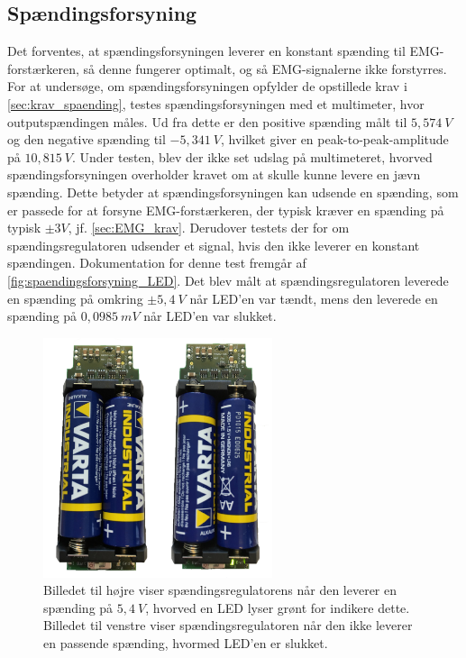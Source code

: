 \subsection{Spændingsforsyning} \label{test_spaendingsforsyning}
Det forventes, at spændingsforsyningen leverer en konstant spænding til EMG-forstærkeren, så denne fungerer optimalt, og så EMG-signalerne ikke forstyrres. For at undersøge, om spændingsforsyningen opfylder de opstillede krav i \ref{sec:krav_spaending}, testes spændingsforsyningen med et multimeter, hvor outputspændingen måles. %
Ud fra dette er den positive spænding målt til $5,574~V$ og den negative spænding til $-5,341~V$, hvilket giver en peak-to-peak-amplitude på $10,815~V$. Under testen, blev der ikke set udslag på multimeteret, hvorved spændingsforsyningen overholder kravet om at skulle kunne levere en jævn spænding. Dette betyder at spændingsforsyningen kan udsende en spænding, som er passede for at forsyne EMG-forstærkeren, der typisk kræver en spænding på typisk $\pm3V$, jf. \autoref{sec:EMG_krav}. 
Derudover testets der for om spændingsregulatoren udsender et signal, hvis den ikke leverer en konstant spændingen. Dokumentation for denne test fremgår  af \autoref{fig:spaendingsforsyning_LED}. Det blev målt at spændingsregulatoren leverede en spænding på omkring $\pm5,4~V$ når LED'en var tændt, mens den leverede en spænding på $0,0985~mV$ når LED'en var slukket.


\begin{figure}[H]
\centering
\includegraphics[width=0.6\textwidth]{figures/bat_test}
\caption{Billedet til højre viser spændingsregulatorens når den leverer en spænding på $5,4~V$, hvorved en LED lyser grønt for indikere dette. Billedet til venstre viser spændingsregulatoren når den ikke leverer en passende spænding, hvormed LED'en er slukket.}
\label{fig:spaendingsforsyning_LED}
\end{figure}


